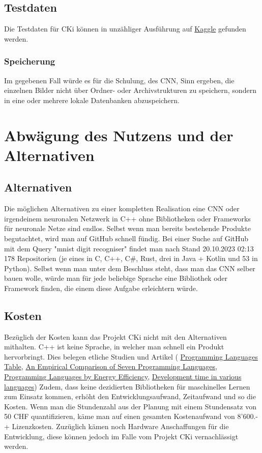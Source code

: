 \subsection{Testdaten}
\label{sec:AnalyseTestdaten}
Die Testdaten für CKi können in unzähliger Ausführung auf \href{https://www.kaggle.com/}{Kaggle} gefunden werden.

\subsubsection{Speicherung}
\label{sec:AnalyseSpeicherung}
Im gegebenen Fall würde es für die Schulung, des CNN, Sinn ergeben, die einzelnen Bilder nicht über Ordner- oder Archivstrukturen zu speichern, sondern in eine oder mehrere lokale Datenbanken abzuspeichern.

\section{Abwägung des Nutzens und der Alternativen}
\label{sec:AnalyseNutzwertanalyseDerLösungsvarianten}
\subsection{Alternativen}
\label{sec:AnalyseAlternativen}
Die möglichen Alternativen zu einer kompletten Realisation eine CNN oder irgendeinem neuronalen Netzwerk in C++ ohne Bibliotheken oder Frameworks für neuronale Netze sind endlos. 
Selbst wenn man bereits bestehende Produkte begutachtet, wird man auf GitHub schnell fündig. Bei einer Suche auf GitHub mit dem Query "mnist digit recogniser" findet man nach Stand 20.10.2023 02:13 178 Repositorien (je eines in C, C++, C\#, Rust, drei in Java + Kotlin und 53 in Python).
Selbst wenn man unter dem Beschluss steht, dass man das CNN selber bauen wolle, würde man für jede beliebige Sprache eine Bibliothek oder Framework finden, die einem diese Aufgabe erleichtern würde.

\subsection{Kosten}
\label{sec:AnalyseKosten}
Bezüglich der Kosten kann das Projekt CKi nicht mit den Alternativen mithalten. C++ ist keine Sprache, in welcher man schnell ein Produkt hervorbringt. Dies belegen etliche Studien und Artikel (
\href{https://www.cs.bsu.edu/homepages/dmz/cs697/langtbl.htm}{Programming Languages Table}, 
\href{https://citeseerx.ist.psu.edu/viewdoc/download?doi=10.1.1.113.1831&rep=rep1&type=pdf}{An Empirical Comparison of Seven Programming Languages},
\href{https://haslab.github.io/SAFER/scp21.pdf}{Programming Languages by Energy Efficiency}, 
\href{https://stackoverflow.com/questions/1894453/development-time-in-various-languages}{Development time in various languages})
Zudem, dass keine dezidierten Bibliotheken für maschinelles Lernen zum Einsatz kommen, erhöht den Entwicklungsaufwand, Zeitaufwand und so die Kosten.
Wenn man die Stundenzahl aus der Planung mit einem Stundensatz von 50 CHF quantifizieren, käme man auf einen gesamten Kostenaufwand von 8'600.- + Lizenzkosten. Zuzüglich kämen noch Hardware Anschaffungen für die Entwicklung, diese können jedoch im Falle vom Projekt CKi vernachlässigt werden.  

